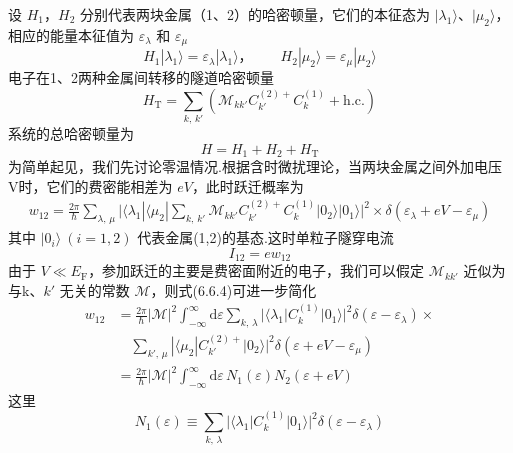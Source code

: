 设 $H_{1}$，$H_{2}$ 分别代表两块金属（1、2）的哈密顿量，它们的本征态为 $|\lambda_{1}\rangle$、$|\mu_{2}\rangle$，相应的能量本征值为 $\varepsilon_{\lambda}$ 和 $\varepsilon_{\mu}$
\begin{equation}
  H_{1}|\lambda_{1}\rangle=\varepsilon_{\lambda}|\lambda_{1}\rangle\text{，}
  \qquad H_{2}|\mu_{2}\rangle=\varepsilon_{\mu}|\mu_{2}\rangle
\end{equation}
电子在1、2两种金属间转移的隧道哈密顿量
\begin{equation}
  H_{\mathrm{T}}=\sum_{k,\,k'}\left(\mathscr{M}_{kk'}C^{(2)+}_{k'}C^{(1)}_{k}
  +\mathrm{h.c.}\right)
\end{equation}
系统的总哈密顿量为
\begin{equation}
  H=H_{1}+H_{2}+H_{\mathrm{T}}
\end{equation}
为简单起见，我们先讨论零温情况.根据含时微扰理论，当两块金属之间外加电压V时，它们的费密能相差为 $eV$，此时跃迁概率为
\begin{equation}
\begin{aligned}
  w_{12}=\frac{2\pi}{\hbar}\sum_{\lambda,\,\mu}
  \bigl|\langle\lambda_{1}|\langle\mu_{2}|
  \sum_{k,\,k'}\mathscr{M}_{kk'}C^{(2)+}_{k'}C^{(1)}_{k}
  |0_{2}\rangle|0_{1}\rangle\bigr|^{2}
  \times\delta\left(\varepsilon_{\lambda}+eV-\varepsilon_{\mu}\right)
\end{aligned}
\end{equation}
其中 $|0_{i}\rangle\ (i=1,2)$ 代表金属(1,2)的基态.这时单粒子隧穿电流
\begin{equation}
  I_{12}=ew_{12}
\end{equation}
由于 $V\ll E_{\mathrm{F}}$，参加跃迁的主要是费密面附近的电子，我们可以假定 $\mathscr{M}_{kk'}$ 近似为与k、$k'$ 无关的常数 $\mathscr{M}$，则式(6.6.4)可进一步简化
\begin{equation}
\begin{aligned}
  w_{12}&=\frac{2\pi}{\hbar}|\mathscr{M}|^{2}
  \int_{-\infty}^{\infty}\mathrm{d}\varepsilon
  \sum_{k,\,\lambda}|\langle\lambda_{1}|C^{(1)}_{k}|0_{1}\rangle|^{2}
  \delta(\varepsilon-\varepsilon_{\lambda})\times\\
  &\quad\sum_{k',\,\mu}|\langle\mu_{2}|C^{(2)+}_{k'}|0_{2}\rangle|^{2}
  \delta(\varepsilon+eV-\varepsilon_{\mu})\\
  &=\frac{2\pi}{\hbar}|\mathscr{M}|^{2}
  \int_{-\infty}^{\infty}\mathrm{d}\varepsilon\,
  N_{1}(\varepsilon)N_{2}(\varepsilon+eV)
\end{aligned}
\end{equation}
这里
\begin{equation}
  N_{1}(\varepsilon)\equiv\sum_{k,\,\lambda}
  |\langle\lambda_{1}|C^{(1)}_{k}|0_{1}\rangle|^{2}
  \delta\left(\varepsilon-\varepsilon_{\lambda}\right)
\end{equation}
